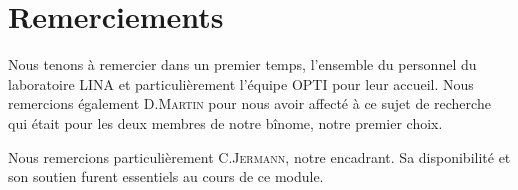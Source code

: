 \chapter*{Remerciements}
{}
Nous tenons à remercier dans un premier temps, l'ensemble du personnel du laboratoire \textsc{LINA} et particulièrement l'équipe \textsc{OPTI} pour leur accueil. Nous remercions également D.\textsc{Martin} pour nous avoir affecté à ce sujet de recherche qui était pour les deux membres de notre bînome, notre premier choix. 

Nous remercions particulièrement C.\textsc{Jermann}, notre encadrant. Sa disponibilité et son soutien furent essentiels au cours de ce module.	
